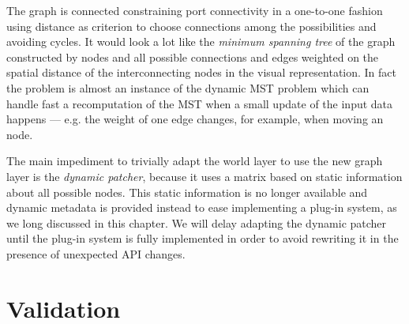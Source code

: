 %

The graph is connected constraining port connectivity in a one-to-one
fashion using distance as criterion to choose connections among the
possibilities and avoiding cycles. It would look a lot like the
\emph{minimum spanning tree} of the graph constructed by nodes and all
possible connections and edges weighted on the spatial distance of the
interconnecting nodes in the visual representation. In fact the
problem is almost an instance of the dynamic MST problem
\cite{spira75dmst} which can handle fast a recomputation of the MST
when a small update of the input data happens --- e.g. the weight of
one edge changes, for example, when moving an node.

The main impediment to trivially adapt the world layer to use the new
graph layer is the \emph{dynamic patcher}, because it uses a matrix
based on static information about all possible nodes. This static
information is no longer available and dynamic metadata is provided
instead to ease implementing a plug-in system, as we long discussed in
this chapter. We will delay adapting the dynamic patcher until the
plug-in system is fully implemented in order to avoid rewriting it in
the presence of unexpected API changes.


\section{Validation}

